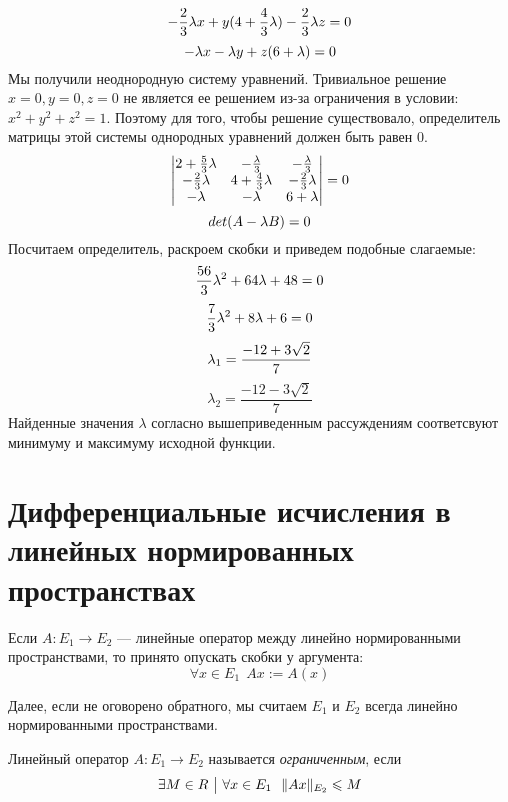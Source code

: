 \begin{solution}
\[    \]
    \[
        -\frac{2}{3}\lambda x + y(4+\frac{4}{3}\lambda)-\frac{2}{3}\lambda z=0\\
    \]
    \[
        -\lambda x - \lambda y + z(6+\lambda)=0\\
     \]
     Мы получили неоднородную систему уравнений. Тривиальное решение $x=0, y=0, z=0$ не является ее решением из-за ограничения в условии: $x^2+y^2+z^2=1$. Поэтому для того, чтобы решение существовало, определитель матрицы этой системы однородных уравнений должен быть равен $0$.
     \[
        \begin{vmatrix}
            2+\frac{5}{3}\lambda & -\frac{\lambda}{3} & -\frac{\lambda}{3}\\
            -\frac{2}{3}\lambda & 4+\frac{4}{3}\lambda & -\frac{2}{3}\lambda\\
            -\lambda & -\lambda & 6+\lambda
        \end{vmatrix} = 0\\
    \]
    \[
        det (A - \lambda B)=0 \\
     \]
     Посчитаем определитель, раскроем скобки и приведем подобные слагаемые:
     \[
        \frac{56}{3}\lambda^2 + 64\lambda+48=0\\
    \]
    \[
        \frac{7}{3}\lambda^2+8\lambda+6=0\\
    \]
    \[
        \lambda_1 = \frac{-12+3\sqrt{2}}{7}\\
    \]
    \[
        \lambda_2 = \frac{-12-3\sqrt{2}}{7}
     \]
    Найденные значения $\lambda$ согласно вышеприведенным рассуждениям соответсвуют минимуму и максимуму исходной функции.
\end{solution}


\section{Дифференциальные исчисления в линейных нормированных пространствах}

\begin{note}
	Если $A \colon E_1 \to E_2$ --- линейные оператор между линейно нормированными пространствами, то принято опускать скобки у аргумента:
	\[
		\forall x \in E_1\ \ Ax := A(x)
	\]
\end{note}

\begin{note}
	Далее, если не оговорено обратного, мы считаем $E_1$ и $E_2$ всегда линейно нормированными пространствами.
\end{note}

\begin{definition}
    Линейный оператор $A \colon E_1 \to E_2$ называется \textit{ограниченным}, если 
    \[
        \exists M \in R \such \forall x \in E_1\ \ \|Ax\|_{E_2} \leq M
    \]
\end{definition}

